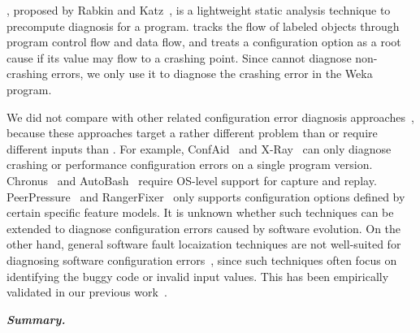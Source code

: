 \conftool, proposed by Rabkin and Katz~\cite{}, is a lightweight
static analysis technique to precompute diagnosis for a program.
\conftool tracks the flow of labeled objects through 
program control flow and data flow, and treats a configuration option
as a root cause if its value may flow to a crashing point.
Since \conftool cannot diagnose non-crashing errors, we only use
it to diagnose the crashing error in the Weka program.



We did not compare \ourtool with other related
configuration error diagnosis approaches~\cite{Attariyan:2010:ACT,
xray, Whitaker:2004:CDS, Su:2007:AIC, Wang:2004:AMT, rangefix},
because these approaches target a rather
different problem than \ourtool or require different
inputs than \ourtool. For example, ConfAid~\cite{Attariyan:2010:ACT}
and X-Ray~\cite{xray} can only diagnose crashing
or performance configuration errors on a single
program version. Chronus~\cite{Whitaker:2004:CDS}
and AutoBash~\cite{Su:2007:AIC}
require OS-level support for capture and replay.
PeerPressure~\cite{Wang:2004:AMT} and RangerFixer~\cite{rangefix} only
supports configuration options defined by certain
specific feature models. It is unknown whether
such techniques can be extended to diagnose configuration
errors caused by software evolution. On the other
hand, general software fault locaization techniques
are not well-suited for diagnosing software
configuration errors~\cite{Jones:2002}, since such techniques
often focus on identifying the buggy code or
invalid input values. This has been empirically
validated in our previous work~\cite{Zhang:2013:ADS}.


\vspace{1mm}

\noindent \textbf{\textit{Summary.}}


